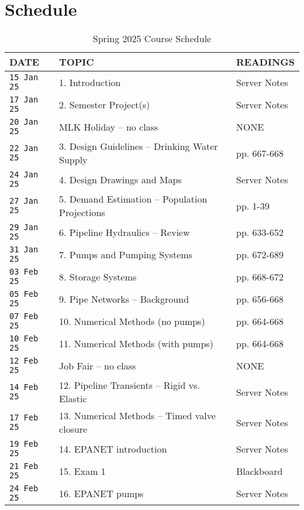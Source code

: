 \documentclass[12pt]{article}
\begin{document}
\section*{Schedule}
\begin{center}
\begin{table}[ht!]
 \caption{Spring 2025 Course Schedule}
   \begin{tabular}{| p{0.8in} | p{3.5in} | p{2.0in} | } 
\hline
\hline
DATE & TOPIC & READINGS \\
\hline
\hline
\texttt{15 Jan 25} & 1. Introduction & Server Notes   \\
\texttt{17 Jan 25} & 2. Semester Project(s) & Server Notes  \\ %
\hline
\texttt{20 Jan 25} & MLK Holiday -- no class &  NONE \\
\texttt{22 Jan 25} & 3. Design Guidelines -- Drinking Water Supply  & \cite{Gupta2017} pp. 667-668\\
\texttt{24 Jan 25} & 4. Design Drawings and Maps   & Server Notes \\ 
\hline
\texttt{27 Jan 25} & 5. Demand Estimation -- Population Projections & \cite{Gupta2017} pp. 1-39\\
\texttt{29 Jan 25} & 6. Pipeline Hydraulics -- Review & \cite{Gupta2017} pp. 633-652\\
\texttt{31 Jan 25} & 7. Pumps and Pumping Systems  & \cite{Gupta2017} pp. 672-689 \\
\hline
\texttt{03 Feb 25} & 8. Storage Systems  & \cite{Gupta2017} pp. 668-672\\
\texttt{05 Feb 25} & 9. Pipe Networks -- Background  & \cite{Gupta2017} pp. 656-668 \\
\texttt{07 Feb 25} & 10. Numerical Methods (no pumps)   & \cite{Gupta2017} pp. 664-668 \\
\hline
\texttt{10 Feb 25} & 11. Numerical Methods (with pumps) & \cite{Gupta2017} pp. 664-668 \\
\texttt{12 Feb 25} & Job Fair -- no class & NONE \\
\texttt{14 Feb 25} & 12. Pipeline Transients -- Rigid vs. Elastic & Server Notes\\
\hline
\texttt{17 Feb 25} & 13. Numerical Methods -- Timed valve closure  & Server Notes\\
\texttt{19 Feb 25} & 14. EPANET introduction & Server Notes\\
\texttt{21 Feb 25} & 15. Exam 1 & Blackboard \\
\hline
\texttt{24 Feb 25} & 16. EPANET pumps & Server Notes  \\

\end{tabular}
\end{table}
\end{center}
\end{document}
